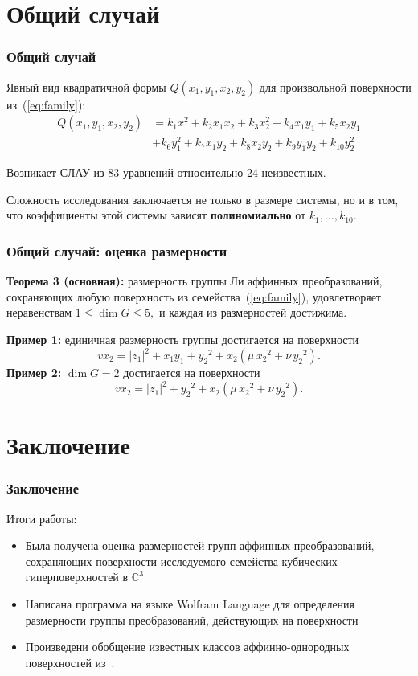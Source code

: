 \documentclass[russian,hyperref={unicode}]{beamer}
\begin{document}
\section{Общий случай}
\frame
{
	\frametitle{Общий случай}
	Явный вид квадратичной формы $Q(x_1, y_1, x_2, y_2)$ для произвольной поверхности из~(\ref{eq:family}): 
	\begin{align*}
	Q(x_1, y_1, x_2, y_2) &= k_1 x_1^2 + k_2 x_1 x_2 + k_3 x_2^2 + k_4 x_1 y_1 + k_5 x_2 y_1 \nonumber\\&+ k_6 y_1^2 + k_7 x_1 y_2 + k_8 x_2 y_2 + k_9 y_1 y_2 + k_{10} y_2^2
	\end{align*}
	
	Возникает СЛАУ из 83 уравнений относительно 24 неизвестных.
	
	Сложность исследования заключается не только в размере системы, но и в том, что 
	коэффициенты этой системы зависят \textbf{полиномиально} от $k_1, \dots, 
	k_{10}$.
}
\frame
{
	\frametitle{Общий случай: оценка размерности}
	\textbf{Теорема 3 (основная):}
	размерность группы Ли аффинных преобразований, сохраняющих 	любую поверхность 
	из семейства~(\ref{eq:family}), удовлетворяет неравенствам 
	$
		1 \le \dim G \le 5, 
	$ и каждая из размерностей достижима.
	
	\textbf{Пример 1:}
	единичная размерность группы достигается на поверхности
	$$
		v x_2 = {|z_1|}^2 +x_1 y_1 + {y_2}^2 + x_2 (\mu\,{x_2}^2 + \nu\,{y_2}^2).
	$$ 
	\textbf{Пример 2:}
	$\dim G = 2$ достигается на поверхности
	$$
		v x_2 = {|z_1|}^2 + {y_2}^2 + x_2 (\mu\,{x_2}^2 + \nu\,{y_2}^2).
	$$ 
}
\section{Заключение}
\frame
{
	\frametitle{Заключение}
	Итоги работы:
	\begin{itemize}
		\item Была получена оценка размерностей групп аффинных преобразований, сохраняющих поверхности исследуемого семейства кубических гиперповерхностей в $\mathbb{C}^3$
		\item Написана программа на языке {\ttfamily Wolfram Language} для определения размерности группы преобразований, действующих на поверхности
		\item Произведени обобщение известных классов аффинно-однородных поверхностей из~\cite{arxiv}.
	\end{itemize}
	
}
\end{document}
